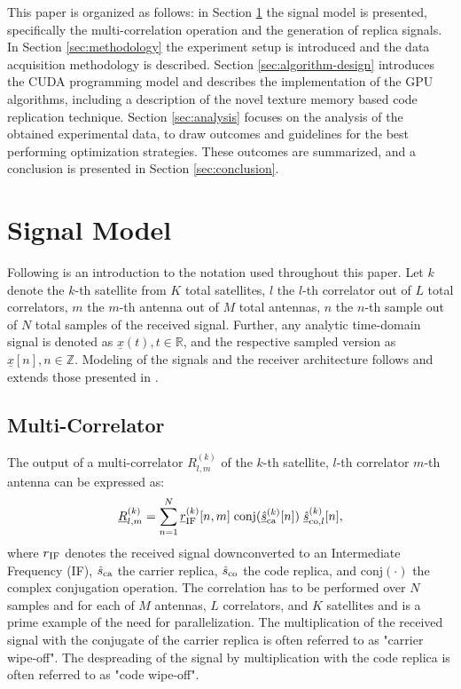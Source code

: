 \documentclass{juliacon}
\begin{document}
This paper is organized as follows: in Section \ref{sec:signal-model} the signal model is presented, specifically the multi-correlation operation and the generation of replica signals. In Section \ref{sec:methodology} the experiment setup is introduced and the data acquisition methodology is described. Section \ref{sec:algorithm-design} introduces the CUDA programming model and describes the implementation of the GPU algorithms, including a description of the novel texture memory based code replication technique. Section \ref{sec:analysis} focuses on the analysis of the obtained experimental data, to draw outcomes and guidelines for the best performing optimization strategies. These outcomes are summarized, and a conclusion is presented in Section \ref{sec:conclusion}.

\section{Signal Model}\label{sec:signal-model}

Following is an introduction to the notation used throughout this paper. Let $k$ denote the $k$-th satellite from $K$ total satellites, $l$ the $l$-th correlator out of $L$ total correlators, $m$ the $m$-th antenna out of $M$ total antennas, $n$ the $n$-th sample out of $N$ total samples of the received signal. Further, any analytic time-domain signal is denoted as $\underline{x}(t), t \in \mathbb{R}$, and the respective sampled version as $\underline{x}[n], n \in \mathbb{Z}$. Modeling of the signals and the receiver architecture follows and extends those presented in \cite{Borre2007, Teunissen2017}.

\subsection*{Multi-Correlator}\label{sub:multi-correlator}
The output of a multi-correlator $R^{(k)}_{l,m}$ of the $k$-th satellite, $l$-th correlator $m$-th antenna can be expressed as:
\begin{equation}\label{eqn:multi-correlator}
    \underline{R}^{(k)}_{l,m} = \sum^N_{n=1} \underline{r}^{(k)}_{\mathrm{IF}}[n, m] \hspace{1mm} \mathrm{conj}(\underline{\hat{s}}^{(k)}_{\mathrm{ca}}[n]) \hspace{1mm} \underline{\hat{s}}_{\mathrm{co}, l}^{(k)}[n] ,
\end{equation}
where $r\textsubscript{IF}$ denotes the received signal downconverted to an Intermediate Frequency (IF), $\hat{s}\textsubscript{ca}$ the carrier replica, $\hat{s}\textsubscript{co}$ the code replica, and $\mathrm{conj}(\cdot)$ the complex conjugation operation. The correlation has to be performed over $N$ samples and for each of $M$ antennas, $L$ correlators, and $K$ satellites and is a prime example of the need for parallelization. The multiplication of the received signal with the conjugate of the carrier replica is often referred to as "carrier wipe-off". The despreading of the signal by multiplication with the code replica is often referred to as "code wipe-off".
\end{document}
